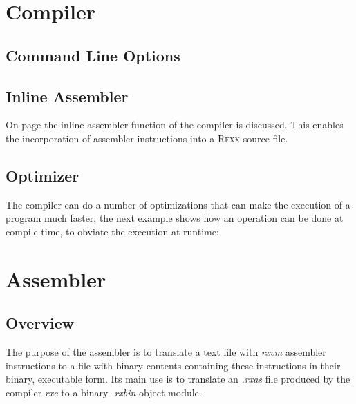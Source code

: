 \chapter{\crexx{} Compiler}
\section{Command Line Options}
\begin{shaded}
  \small
  \obeylines {}
 \end{shaded}
 \section{Inline Assembler}
 On page \pageref{inlineAssembly} the inline assembler function of
 the \crexx{} compiler is discussed. This enables the incorporation
 of  assembler instructions into a \textsc{Rexx} source
 file.

\section{Optimizer}\label{fpowexample}
 The compiler can do a number of optimizations that can make the
 execution of a program much faster; the next example shows how an
 operation can be done at compile time, to obviate the execution at
 runtime:
 

\begin{shaded}
  \small
\obeylines {}
\end{shaded}

 
\chapter{\crexx{} Assembler}
\section{Overview}
The purpose of the \crexx{} assembler  is to translate a text file with
\emph{rxvm} assembler instructions to a file with binary contents containing these
instructions in their binary, executable form. Its main use is to
translate an \emph{.rxas} file produced by the \crexx{} compiler
\emph{rxc} to a binary \emph{.rxbin} object module.

